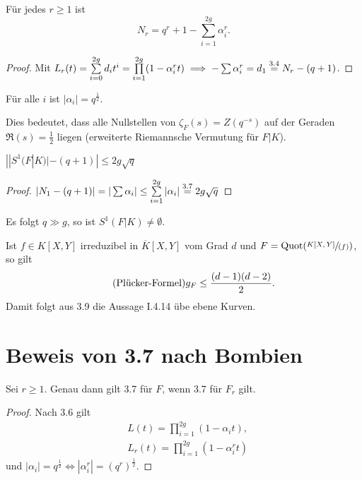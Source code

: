 \begin{korollar}
    Für jedes $r \geq 1$ ist
    $$ N_r = q^r + 1 - \sum_{i=1}^{2g} \alpha_i^r.$$
\end{korollar}
\begin{proof}
    Mit $L_r(t) = \sum\limits_{i=0}^{2g} d_i t^i = \prod\limits_{i=1}^{2g} (1-\alpha_i^r t) \implies
    - \sum \alpha_i^r = d_1 \stackrel{\text{3.4}}{=} N_r - (q+1)$.
\end{proof}

\begin{theorem}[Weil 1948]
    Für alle $i$ ist $|\alpha_i| = q^\frac{1}{2}$.
\end{theorem}

\begin{bemerkungnr}
    Dies bedeutet, dass alle Nullstellen von $\zeta_F(s) = Z(q^{-s})$ auf der Geraden $\Re(s) = \frac{1}{2}$ liegen (erweiterte Riemannsche Vermutung für $F|K$).
\end{bemerkungnr}

\begin{korollar}
    $\left| |S^1(F|K)| - (q+1) \right| \leq 2g \sqrt{q}$
\end{korollar}
\begin{proof}
    $|N_1 - (q+1)| = |\sum\alpha_i| \leq \sum\limits_{i=1}^{2g}|\alpha_i| \stackrel{\text{3.7}}{=} 2g \sqrt{q}$
\end{proof}

\begin{beispiel}
    Es folgt $q \gg g$, so ist $S^1(F|K) \ne \emptyset$.
\end{beispiel}

\begin{bemerkungnr}
    Ist $f \in K[X,Y]$ irreduzibel in $\overline{K}[X,Y]$ vom Grad $d$ und $F = \operatorname{Quot}(\sfrac{K[X,Y]}{(f)})$, so gilt
    \begin{equation}\tag{\text{Plücker-Formel}}
        g_F \leq \frac{(d-1)(d-2)}{2}.
    \end{equation}
    Damit folgt aus 3.9 die Aussage I.4.14 übe ebene Kurven.
\end{bemerkungnr}

\section{Beweis von 3.7 nach Bombien}
\begin{satz}
    Sei $r \geq 1$. Genau dann gilt 3.7 für $F$, wenn 3.7 für $F_r$ gilt.
\end{satz}
\begin{proof}
    Nach 3.6 gilt
    \begin{align*}
        & L(t) = \prod_{i=1}^{2g} (1-\alpha_it),\\
        & L_r(t) = \prod_{i=1}^{2g} (1-\alpha_i^rt)
    \end{align*}
    und $|\alpha_i| = q^\frac{1}{2} \iff |\alpha_i^r| = (q^r)^\frac{1}{2}$.
\end{proof}

